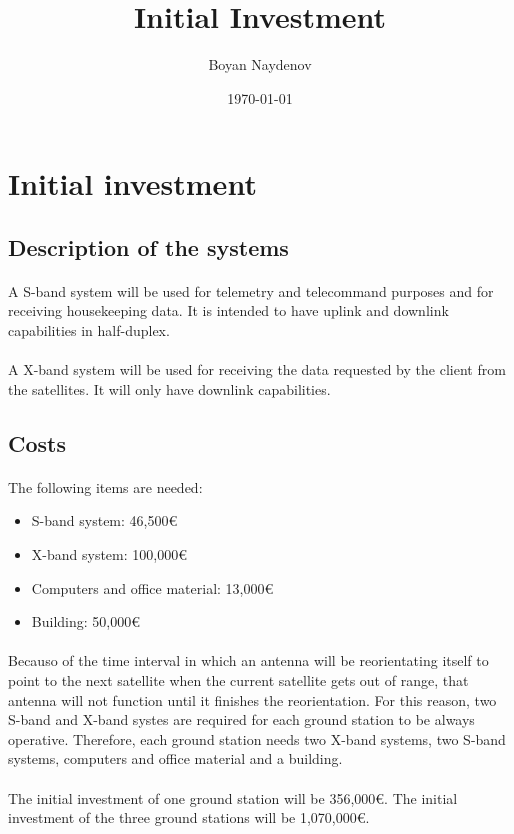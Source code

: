 \documentclass[12pt,a4paper]{report}
\author{Boyan Naydenov}
\title{Initial Investment}
\date{\today}
\begin{document}
\maketitle
\tableofcontents
\listoffigures
\listoftables

\newpage

\section{Initial investment}

\subsection{Description of the systems}

\paragraph{}A S-band system will be used for telemetry and telecommand purposes and for receiving housekeeping data. It is intended to have uplink and downlink capabilities in half-duplex.

\paragraph{}A X-band system will be used for receiving the data requested by the client from the satellites. It will only have downlink capabilities.

\subsection{Costs}

\paragraph{}The following items are needed:
\begin{itemize}
\item S-band system: 46,500\euro
\item X-band system: 100,000\euro
\item Computers and office material: 13,000\euro
\item Building: 50,000\euro
\end{itemize}

\paragraph{}Becauso of the time interval in which an antenna will be reorientating itself to point to the next satellite when the current satellite gets out of range, that antenna will not function until it finishes the reorientation. For this reason, two S-band and X-band systes are required for each ground station to be always operative. Therefore, each ground station needs two X-band systems, two S-band systems, computers and office material and a building.

\paragraph{}The initial investment of one ground station will be 356,000\euro . The initial investment of the three ground stations will be 1,070,000\euro .
\end{document}
